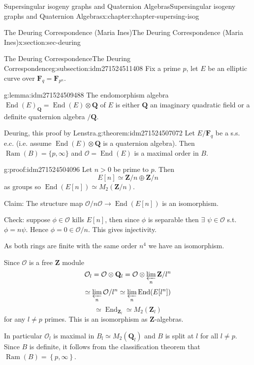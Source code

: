 \documentclass[oneside,10pt,]{book}
\numberwithin{equation}{section}
\newcommand{\lb}{[}
\newcommand{\rb}{]}
\newcommand{\ZZ}{\mathbf{Z}}
\newcommand{\QQ}{\mathbf{Q}}
\newcommand{\FF}{\mathbf{F}}
\newcommand{\ints}{\mathcal{O}}
\DeclareMathOperator{\End}{End}
\newcommand{\gt}{>}
\begin{document}
\begin{chapterptx}{Supersingular isogeny graphs and Quaternion Algebras}{}{Supersingular isogeny graphs and Quaternion Algebras}{}{}{x:chapter:chapter-supersing-isog}
\begin{sectionptx}{The Deuring Correspondence (Maria Ines)}{}{The Deuring Correspondence (Maria Ines)}{}{}{x:section:sec-deuring}
\typeout{************************************************}
%
\begin{subsectionptx}{The Deuring Correspondence}{}{The Deuring Correspondence}{}{}{g:subsection:idm271524511408}
Fix a prime \(p\), let \(E\) be an elliptic curve over \(\FF_q = \FF_{p^n}\).%
\begin{lemma}{}{}{g:lemma:idm271524509488}%
The endomorphism algebra  \(\End(E)_\QQ = \End(E) \otimes \QQ\) of \(E\) is either \(\QQ\) an imaginary quadratic field or a definite quaternion algebra \(/\QQ\).%
\end{lemma}
\begin{theorem}{Deuring, this proof by Lenstra.}{}{g:theorem:idm271524507072}%
Let \(E/\FF_q\) be a s.s. e.c. (i.e. assume \(\End(E) \otimes \QQ\) is a quaternion algebra). Then \(\operatorname{Ram}(B)  =    \{p, \infty\}\) and \(\ints = \End(E) \) is a maximal order in \(B\).%
\end{theorem}
\begin{proofptx}{}{g:proof:idm271524504096}
Let \(n \gt 0\)  be prime to \(p \). Then%
\begin{equation*}
E \lb n \rb  \simeq \ZZ/ n \oplus \ZZ/n
\end{equation*}
as groups so \(\End(E\lb n\rb ) \simeq M_2(\ZZ/n)\).%
\par
Claim: The structure map \(\ints/n\ints  \to \End(E\lb n \rb)\) is an isomorphism.%
\par
Check: suppose \(\phi \in  \ints\) kills \(E\lb n \rb\), then since \(\phi\) is separable then \(\exists\) \(\psi \in \ints\) s.t. \(\phi = n \psi\). Hence \(\phi = 0 \in \ints/n\). This gives injectivity.%
\par
As both rings are finite with the same order \(n^4\) we have an isomorphism.%
\par
Since \(\ints\) is a free \(\ZZ\) module%
\begin{equation*}
\ints_l = \ints \otimes \QQ_l = \ints \otimes \varprojlim _n \ZZ/l^n
\end{equation*}
%
\begin{equation*}
\simeq \varprojlim_n \ints/l^n \simeq \varprojlim_n \End(E[l^n])
\end{equation*}
%
\begin{equation*}
\simeq \End_{\ZZ_l}  \simeq M_2( \ZZ_l)
\end{equation*}
for any \(l \ne p\) primes. This is an isomorphism as \(\ZZ\)-algebras.%
\par
In particular \(\ints_l\) is maximal in \(B_l \simeq M_2(\QQ_l)\) and \(B\) is split at \(l\) for all \(l\ne p\). Since \(B\) is definite, it follows from the classification theorem that \(\operatorname{Ram}(B)  = \left\{ p, \infty \right\}\).%

\end{proofptx}
\end{subsectionptx}
\end{sectionptx}
\end{chapterptx}
\end{document}
